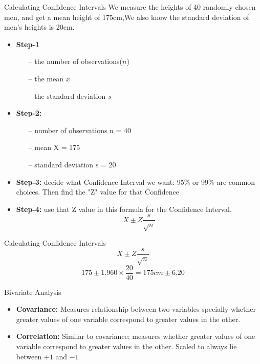 \documentclass[10pt,dvipsnames, aspectratio=169]{beamer}
\begin{document}
\begin{frame}[t]{Calculating Confidence Intervals}
	We measure the heights of 40 randomly chosen men, and get a mean height of 
	175cm,We also know the standard deviation of men's heights is 20cm.
	
	\begin{itemize}
		\item \textbf{Step-1}
		\begin{itemize}
			\item[--]  the number of observations($n$)
			\item[--]  the mean $\overline{x}$
			\item[--] the standard deviation $s$
		\end{itemize}
		\item \textbf{Step-2:}
		\begin{itemize}
			\item[--]  number of observations n = 40
			\item[--]  mean X = 175
			\item[--]  standard deviation s = 20
		\end{itemize}
		\item \textbf{Step-3:} decide what Confidence Interval we want: 95\% or 
		99\% are common choices. Then find the "Z" value for that Confidence 
		\item \textbf{Step-4:} use that Z value in this formula for the 
		Confidence Interval.
		$$
		X \pm Z\frac{s}{\sqrt{n}}
		$$
	\end{itemize}
\end{frame}

\begin{frame}[t]{Calculating Confidence Intervals}
	$$
	X \pm Z\frac{s}{\sqrt{n}}
	$$
	$$
	175\pm 1.960 \times \frac{20}{40} = 175cm\pm 6.20
	$$
\end{frame}

\begin{frame}[t]{Bivariate Analysis}
	\begin{itemize}
		\item \textbf{Covariance:} Measures relationship between 
		two variables specially whether greater values of one variable 
		correspond to greater values in the other.
		\item \textbf{Correlation:} Similar to covariance; measures whether 
		greater values of one  variable correspond to greater values in the 
		other. Scaled to always lie between $+1$ and $-1$
	\end{itemize}
\end{frame}
\end{document}
